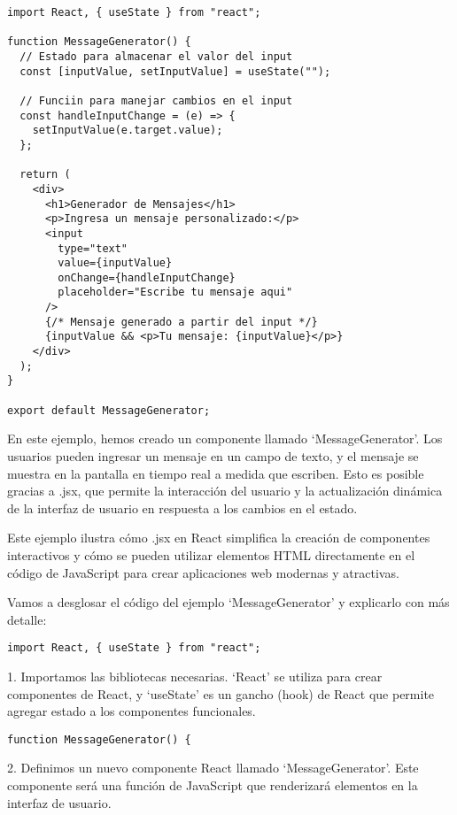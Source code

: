 \documentclass[executivepaper]{article}
\begin{document}
\begin{lstlisting}
import React, { useState } from "react";

function MessageGenerator() {
  // Estado para almacenar el valor del input
  const [inputValue, setInputValue] = useState("");
  
  // Funciin para manejar cambios en el input
  const handleInputChange = (e) => {
    setInputValue(e.target.value);
  };

  return (
    <div>
      <h1>Generador de Mensajes</h1>
      <p>Ingresa un mensaje personalizado:</p>
      <input
        type="text"
        value={inputValue}
        onChange={handleInputChange}
        placeholder="Escribe tu mensaje aqui"
      />
      {/* Mensaje generado a partir del input */}
      {inputValue && <p>Tu mensaje: {inputValue}</p>}
    </div>
  );
}

export default MessageGenerator;
\end{lstlisting}

En este ejemplo, hemos creado un componente llamado \enquote*{MessageGenerator}. Los usuarios pueden ingresar un mensaje en un campo de texto, y el mensaje se muestra en la pantalla en tiempo real a medida que escriben. Esto es posible gracias a .jsx, que permite la interacción del usuario y la actualización dinámica de la interfaz de usuario en respuesta a los cambios en el estado.

Este ejemplo ilustra cómo .jsx en React simplifica la creación de componentes interactivos y cómo se pueden utilizar elementos HTML directamente en el código de JavaScript para crear aplicaciones web modernas y atractivas.

Vamos a desglosar el código del ejemplo \enquote*{MessageGenerator} y explicarlo con más detalle:

\begin{lstlisting}
import React, { useState } from "react";
\end{lstlisting}
  
  1. Importamos las bibliotecas necesarias. \enquote*{React} se utiliza para crear componentes de React, y \enquote*{useState} es un gancho (hook) de React que permite agregar estado a los componentes funcionales.
  
\begin{lstlisting}
function MessageGenerator() {
\end{lstlisting}
  
  2. Definimos un nuevo componente React llamado \enquote*{MessageGenerator}. Este componente será una función de JavaScript que renderizará elementos en la interfaz de usuario.
  
\end{document}
